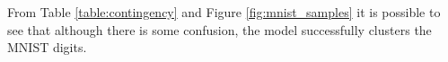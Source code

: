 %
From Table \ref{table:contingency} and Figure \ref{fig:mnist_samples} it is possible
to see that although there is some confusion, the model successfully clusters
the MNIST digits.
